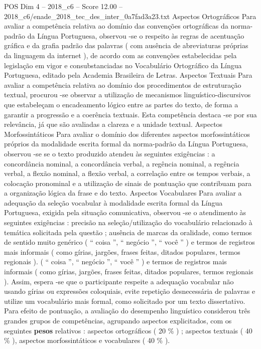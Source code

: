 \begin{textsample}{POS Dim 4 – 2018\_c6 – Score 12.00 – 2018\_c6/enade\_2018\_tec\_des\_inter\_0a7fad3a23.txt}
Aspectos Ortográficos Para avaliar a competência relativa ao domínio das convenções ortográficas da norma-padrão da Língua Portuguesa, observou -se o respeito às regras de acentuação gráfica e da grafia padrão das palavras ( com ausência de abreviaturas próprias da linguagem da internet ), de acordo com as convenções estabelecidas pela legislação em vigor e consubstanciadas no Vocabulário Ortográfico da Língua Portuguesa, editado pela Academia Brasileira de Letras.
Aspectos Textuais Para avaliar a competência relativa ao domínio dos procedimentos de estruturação textual, procurou -se observar a utilização de mecanismos linguístico-discursivos que estabeleçam o encadeamento lógico entre as partes do texto, de forma a garantir a progressão e a coerência textuais.
Esta competência destaca -se por sua relevância, já que são avaliadas a clareza e a unidade textual.
Aspectos Morfossintáticos Para avaliar o domínio dos diferentes aspectos morfossintáticos próprios da modalidade escrita formal da norma-padrão da Língua Portuguesa, observou -se se o texto produzido atendeu às seguintes exigências : a concordância nominal, a concordância verbal, a regência nominal, a regência verbal, a flexão nominal, a flexão verbal, a correlação entre os tempos verbais, a colocação pronominal e a utilização de sinais de pontuação que contribuam para a organização lógica da frase e do texto.
Aspectos Vocabulares Para avaliar a adequação da seleção vocabular à modalidade escrita formal da Língua Portuguesa, exigida pela situação comunicativa, observou -se o atendimento às seguintes exigências : precisão na seleção/utilização do vocabulário relacionado à temática solicitada pela questão ; ausência de marcas da oralidade, como termos de sentido muito genérico ( “ coisa ”, “ negócio ”, “ você ” ) e termos de registros mais informais ( como gírias, jargões, frases feitas, ditados populares, termos regionais ). ( “ coisa ”, “ negócio ”, “ você ” ) e termos de registros mais informais ( como gírias, jargões, frases feitas, ditados populares, termos regionais ).
Assim, espera -se que o participante respeite a adequação vocabular não usando gírias ou expressões coloquiais, evite repetição desnecessária de palavras e utilize um vocabulário mais formal, como solicitado por um texto dissertativo.
Para efeito de pontuação, a avaliação do desempenho linguístico considerou três grandes grupos de competências, agrupando aspectos explicitados, com os seguintes \textbf{pesos} relativos : aspectos ortográficos ( 20 \% ) ; aspectos textuais ( 40 \% ), aspectos morfossintáticos e vocabulares ( 40 \% ).

\end{textsample}
